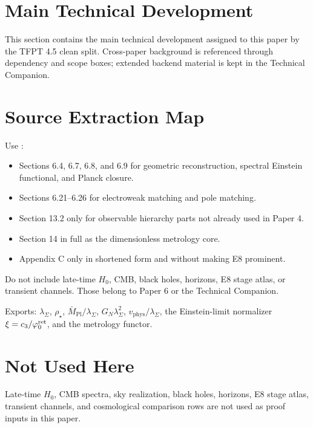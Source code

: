 \documentclass[11pt,a4paper]{article}
\begin{document}
\clearpage
\section{Main Technical Development}

This section contains the main technical development assigned to this paper by the TFPT 4.5 clean split. Cross-paper background is referenced through dependency and scope boxes; extended backend material is kept in the Technical Companion.



\section{Source Extraction Map}

\begin{tfptsourcebox}
Use \sourceDraft:
\begin{itemize}[leftmargin=1.5em]
    \item Sections 6.4, 6.7, 6.8, and 6.9 for geometric reconstruction, spectral Einstein
    functional, and Planck closure.
    \item Sections 6.21--6.26 for electroweak matching and pole matching.
    \item Section 13.2 only for observable hierarchy parts not already used in Paper 4.
    \item Section 14 in full as the dimensionless metrology core.
    \item Appendix C only in shortened form and without making E8 prominent.
\end{itemize}
\end{tfptsourcebox}

\begin{tfptwarningbox}
Do not include late-time $H_0$, CMB, black holes, horizons, E8 stage atlas, or transient channels.
Those belong to Paper 6 or the Technical Companion.
\end{tfptwarningbox}


\begin{tfptexports}
Exports: $\lambda_\Sigma$, $\rho_\star$, $\bar M_{\mathrm{Pl}}/\lambda_\Sigma$, $G_N\lambda_\Sigma^2$, $v_{\mathrm{phys}}/\lambda_\Sigma$, the Einstein-limit normalizer $\xi=c_3/\varphi_0^{\mathrm{ret}}$, and the metrology functor.
\end{tfptexports}

\section{Not Used Here}

Late-time $H_0$, CMB spectra, sky realization, black holes, horizons, E8 stage atlas, transient
channels, and cosmological comparison rows are not used as proof inputs in this paper.
\end{document}
